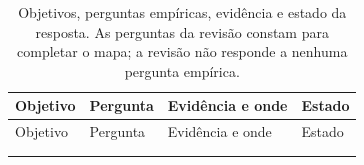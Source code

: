 {\small
\begin{xltabular}{\linewidth}{@{}>{\raggedright\arraybackslash}p{1.7cm}>{\raggedright\arraybackslash}X>{\raggedright\arraybackslash}X>{\raggedright\arraybackslash}p{3.1cm}@{}}
\caption[Objetivos, perguntas, evidência e estado da resposta]{Objetivos,
  perguntas empíricas, evidência e estado da resposta. As perguntas da
  revisão constam para completar o mapa; a revisão não responde a nenhuma
  pergunta empírica.}\label{tab:objetivos-perguntas}\\
\toprule
Objetivo & Pergunta & Evidência e onde & Estado \\
\midrule
\endfirsthead
\toprule
Objetivo & Pergunta & Evidência e onde & Estado \\
\midrule
\endhead
\midrule
{}\\
\endfoot
\bottomrule
\endlastfoot


\end{xltabular}}
